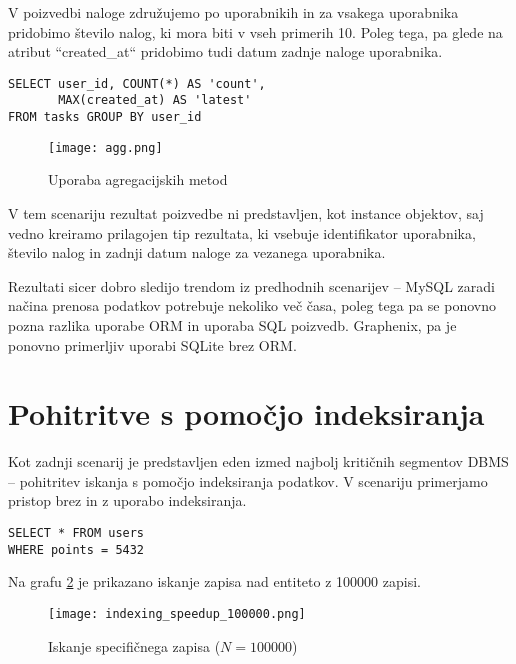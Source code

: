\documentclass[a4paper,12pt,openright]{book}
\begin{document}
    V poizvedbi naloge združujemo po uporabnikih in za vsakega uporabnika pridobimo število nalog, ki mora biti v vseh primerih 10. Poleg tega, pa glede na atribut ``created\_at`` pridobimo tudi datum zadnje naloge uporabnika.
    
\begin{verbatim}
SELECT user_id, COUNT(*) AS 'count', 
       MAX(created_at) AS 'latest' 
FROM tasks GROUP BY user_id
\end{verbatim}

    \begin{figure}[H]
        \centerline{\texttt{[image: agg.png]}}
        \caption{Uporaba agregacijskih metod}
        \label{agg}
    \end{figure}

    \noindent
    V tem scenariju rezultat poizvedbe ni predstavljen, kot instance objektov, saj vedno kreiramo prilagojen tip rezultata, ki vsebuje identifikator uporabnika, število nalog in zadnji datum naloge za vezanega uporabnika.

    Rezultati sicer dobro sledijo trendom iz predhodnih scenarijev – MySQL zaradi načina prenosa podatkov potrebuje nekoliko več časa, poleg tega pa se ponovno pozna razlika uporabe ORM in uporaba SQL poizvedb. Graphenix, pa je ponovno primerljiv uporabi SQLite brez ORM.

    \section{Pohitritve s pomočjo indeksiranja}

    Kot zadnji scenarij je predstavljen eden izmed najbolj kritičnih segmentov DBMS – pohitritev iskanja s pomočjo indeksiranja podatkov. V scenariju primerjamo pristop brez in z uporabo indeksiranja.
    
\begin{verbatim}
SELECT * FROM users
WHERE points = 5432
\end{verbatim}

    \noindent
    Na grafu \ref{old_speedup} je prikazano iskanje zapisa nad entiteto z \num{100000} zapisi.

    \begin{figure}[H]
        \centerline{\texttt{[image: indexing\_speedup\_100000.png]}}
        \caption{Iskanje specifičnega zapisa ($N = \num{100000}$)}
        \label{old_speedup}
    \end{figure}
\end{document}
